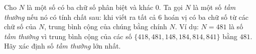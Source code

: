 \ifshowproblem
\begin{problem}\label{example:CAN-2015-QRC-P3}
	Cho \( N \) là một số có ba chữ số phân biệt và khác 0. Ta gọi \( N \) là một số \textit{tầm thường} nếu nó có tính chất sau:
	khi viết ra tất cả 6 hoán vị có ba chữ số từ các chữ số của \( N \), trung bình cộng của chúng bằng chính \( N \).
	Ví dụ: \( N = 481 \) là số \textit{tầm thường} vì trung bình cộng của các số \( \{418, 481, 148, 184, 814, 841\} \) bằng \( 481 \).
	Hãy xác định số \textit{tầm thường} lớn nhất.	
\end{problem}
\fi

\footnotemark
{}
\fi